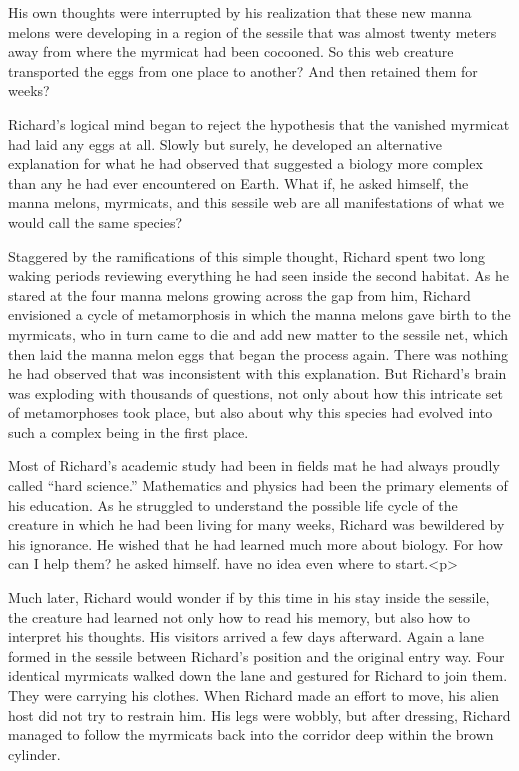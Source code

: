 \documentclass[]{article}
\begin{document}
{{His own thoughts were interrupted by his realization that these new manna melons were developing in a region of the sessile that was almost twenty meters away from where the myrmicat had been cocooned. So this web creature transported the eggs from one place to another? And then retained them for weeks?

Richard’s logical mind began to reject the hypothesis that the vanished myrmicat had laid any eggs at all. Slowly but surely, he developed an alternative explanation for what he had observed that suggested a biology more complex than any he had ever encountered on Earth. What if, he asked himself, the manna melons, myrmicats, and this sessile web are all manifestations of what we would call the same species?

Staggered by the ramifications of this simple thought, Richard spent two long waking periods reviewing everything he had seen inside the second habitat. As he stared at the four manna melons growing across the gap from him, Richard envisioned a cycle of metamorphosis in which the manna melons gave birth to the myrmicats, who in turn came to die and add new matter to the sessile net, which then laid the manna melon eggs that began the process again. There was nothing he had observed that was inconsistent with this explanation. But Richard’s brain was exploding with thousands of questions, not only about how this intricate set of metamorphoses took place, but also about why this species had evolved into such a complex being in the first place.

Most of Richard’s academic study had been in fields mat he had always proudly called “hard science.” Mathematics and physics had been the primary elements of his education. As he struggled to understand the possible life cycle of the creature in which he had been living for many weeks, Richard was bewildered by his ignorance. He wished that he had learned much more about biology. For how can I help them? he asked himself. have no idea even where to start.<p>

Much later, Richard would wonder if by this time in his stay inside the sessile, the creature had learned not only how to read his memory, but also how to interpret his thoughts. His visitors arrived a few days afterward. Again a lane formed in the sessile between Richard’s position and the original entry way. Four identical myrmicats walked down the lane and gestured for Richard to join them. They were carrying his clothes. When Richard made an effort to move, his alien host did not try to restrain him. His legs were wobbly, but after dressing, Richard managed to follow the myrmicats back into the corridor deep within the brown cylinder.

}}
\end{document}
